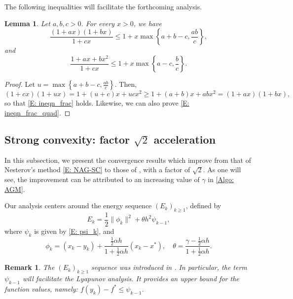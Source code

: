 \documentclass[pdflatex,sn-mathphys-num]{sn-jnl}
\theoremstyle{thmstyleone}
\newtheorem{lemma}[theorem]{Lemma}
\theoremstyle{thmstyletwo}
\newtheorem{remark}{Remark}
\theoremstyle{thmstylethree}
\begin{document}
The following inequalities will facilitate the forthcoming analysis.

\begin{lemma}
Let $a,b,c>0$. For every $x>0$, we have
\begin{equation}\label{E: ineqn_frac}
\frac{ (1+ax)(1+bx) }{1+cx} \le 1 + x\max\left\{ a+b-c, \frac{ab}{c} \right\},
\end{equation}
and
\begin{equation}\label{E: ineqn_frac_quad}
\frac{1+ax+bx^2}{1+cx} \le 1 + x\max\left\{ a-c, \frac{b}{c} \right\}.
\end{equation}
\end{lemma}

\begin{proof}
Let $u = \max\left\{ a+b-c, \frac{ab}{c} \right\}$. Then,
$$ (1+cx)(1+ux) = 1 + (u+c)x + ucx^2 \ge 1 + (a+b)x + abx^2 = (1+ax)(1+bx), $$
so that \eqref{E: ineqn_frac} holds. Likewise, we can also prove \eqref{E: ineqn_frac_quad}.
\end{proof}




\subsection{Strong convexity: factor \texorpdfstring{$\sqrt{2}$}{} acceleration} \label{SS:Algorithms_sqrt2}
In this subsection, we present the convergence results which improve from that of Nesterov's method \eqref{E: NAG-SC} to those of \cite{Luo_2021,Park_2023}, with a factor of $\sqrt{2}$. As one will see, the improvement can be attributed to an increasing value of $\gamma$ in \eqref{Algo: AGM}. 

Our analysis centers around the energy sequence $(E_k)_{k\ge 1}$, defined by
\begin{equation}\label{E: E_k_SC}
E_k = \frac{1}{2}\| \phi_k \|^2 + \theta h^2 \psi_{k-1},
\end{equation}
where $\psi_k$ is given by \eqref{E: psi_k}, and
$$ \phi_k = (x_k-y_k) + \frac{ \frac{1}{2}\alpha h }{ 1 + \frac{1}{2}\alpha h }(x_k-x^*),
\quad
\theta = \frac{ \gamma-\frac{1}{2}\alpha h }{1 + \frac{1}{2}\alpha h}. $$

\begin{remark}
The $(E_k)_{k\ge 1}$ sequence was introduced in \cite{Park_2023}. In particular, the term $\psi_{k-1}$ will facilitate the Lyapunov analysis. It provides an upper bound for the function values, namely: $f(y_k)-f^*\le\psi_{k-1}$.
\end{remark}
\end{document}
